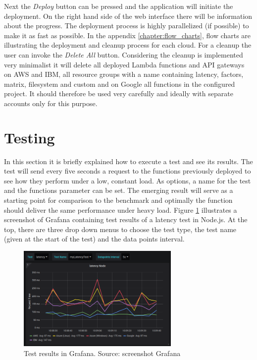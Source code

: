 Next the \textit{Deploy} button can be pressed and the application will initiate the deployment. On the right hand side of the web interface there will be information about the progress. The deployment process is highly parallelized (if possible) to make it as fast as possible. In the appendix \ref{chapter:flow_charts}, flow charts are illustrating the deployment and cleanup process for each cloud. For a cleanup the user can invoke the \textit{Delete All} button. Considering the cleanup is implemented very minimalist it will delete all deployed Lambda functions and \gls{API} gateways on \gls{AWS} and IBM, all resource groups with a name containing latency, factors, matrix, filesystem and custom and on Google all functions in the configured project. It should therefore be used very carefully and ideally with separate accounts only for this purpose.

\section{Testing}
In this section it is briefly explained how to execute a test and see its results. The test will send every five seconds a request to the functions previously deployed to see how they perform under a low, constant load. As options, a name for the test and the functions parameter can be set. The emerging result will serve as a starting point for comparison to the benchmark and optimally the function should deliver the same performance under heavy load. Figure \ref{fig:grafana} illustrates a screenshot of Grafana containing test results of a latency test in Node.js. At the top, there are three drop down menus to choose the test type, the test name (given at the start of the test) and the data points interval.

\begin{figure}[htp]
\begin{center}
\includegraphics[width=0.7\textwidth]{bilder/grafana.png}
\captionsetup{justification=centering, labelfont=bf}
\caption[Test results in Grafana]{Test results in Grafana. Source: screenshot Grafana}
\label{fig:grafana}
\end{center}
\end{figure}

